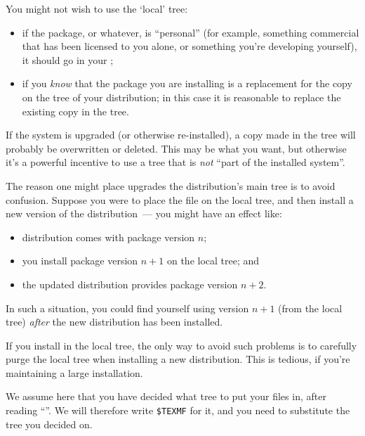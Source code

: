 You might not wish to use the `local' tree:
\begin{itemize}
\item if the package, or whatever, is ``personal'' (for example,
  something commercial that has been licensed to you alone, or
  something you're developing yourself), it should go in your
  ;
\item if you \emph{know} that the package you are installing is a
  replacement for the copy on the  tree of your \AllTeX{}
  distribution; in this case it is reasonable to replace the existing
  copy in the  tree.
\end{itemize}
If the system is upgraded (or otherwise re-installed), a copy made in
the  tree will probably be overwritten or deleted.  This
may be what you want, but otherwise it's a powerful incentive to use a
tree that is \emph{not} ``part of the installed system''.

The reason one might place upgrades the distribution's main tree is to
avoid confusion.  Suppose you were to place the file on the local
tree, and then install a new version of the distribution~--- you might
have an effect like:
\begin{itemize}
\item distribution comes with package version \ensuremath{n};
\item you install package version \ensuremath{n+1} on the local tree; and
\item the updated distribution provides package version \ensuremath{n+2}.
\end{itemize}
In such a situation, you could find yourself using version
\ensuremath{n+1} (from the local tree) \emph{after} the new
distribution has been installed.

If you install in the local tree, the only way to avoid such problems
is to carefully purge the local tree when installing a new
distribution.  This is tedious, if you're maintaining a large
installation.


We assume here that you have decided what tree to put your files in,
after reading %
``''.  We will therefore
write \texttt{\$TEXMF} for it, and you need to substitute the tree
you decided on.

